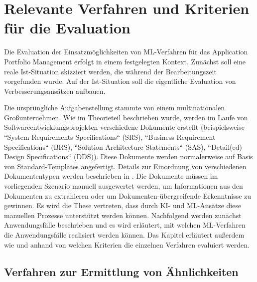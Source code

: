 \chapter{Relevante Verfahren und Kriterien für die Evaluation}
\label{kriterien}

Die Evaluation der Einsatzmöglichkeiten von ML-Verfahren für das Application Portfolio Management erfolgt in einem festgelegten Kontext. Zunächst soll eine reale Ist-Situation skizziert werden, die während der Bearbeitungszeit vorgefunden wurde.  Auf der Ist-Situation soll die eigentliche Evaluation von Verbesserungsansätzen aufbauen. 

Die ursprüngliche Aufgabenstellung stammte von einem multinationalen Großunternehmen. Wie im Theorieteil beschrieben wurde, werden im Laufe von Softwareentwicklungsprojekten verschiedene Dokumente erstellt (beispielsweise ``System Requirements Specifications`` (SRS), ``Business Requirement Specifications`` (BRS), ``Solution Architecture Statements`` (SAS), ``Detail(ed) Design Specifications`` (DDS)). Diese Dokumente werden normalerweise auf Basis von Standard-Templates angefertigt. Details zur Einordnung von verschiedenen Dokumententypen werden beschrieben in \cite{reiss}. Die Dokumente müssen im vorliegenden Szenario manuell ausgewertet werden, um Informationen aus den Dokumenten zu extrahieren oder um Dokumenten-übergreifende Erkenntnisse zu gewinnen. Es wird die These vertreten, dass durch KI- und ML-Ansätze diese manuellen Prozesse unterstützt werden können. Nachfolgend werden zunächst Anwendungsfälle beschrieben und es wird erläutert, mit welchen ML-Verfahren die Anwendungsfälle realisiert werden können. Das Kapitel erläutert außerdem wie und anhand von welchen Kriterien die einzelnen Verfahren evaluiert werden. 

\section{Verfahren zur Ermittlung von Ähnlichkeiten}


